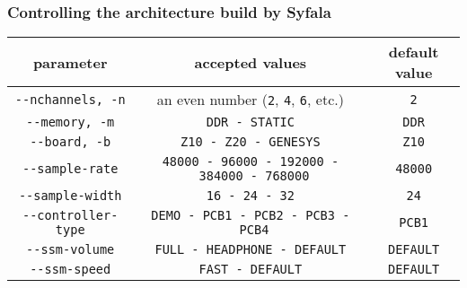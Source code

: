 \subsubsection{Controlling the architecture build by Syfala}

\begin{tabular}{|c|c|c|}
  \toprule
parameter & accepted values & default value \\
\midrule
\texttt{-\/-nchannels,\ -n} & an even number (\texttt{2}, \texttt{4},
\texttt{6}, etc.) & \texttt{2} \\
\texttt{-\/-memory,\ -m} & \texttt{DDR\ -\ STATIC} & \texttt{DDR} \\
\texttt{-\/-board,\ -b} & \texttt{Z10\ -\ Z20\ -\ GENESYS} &
\texttt{Z10} \\
\texttt{-\/-sample-rate} &
\texttt{48000\ -\ 96000\ -\ 192000\ -\ 384000\ -\ 768000} &
\texttt{48000} \\
\texttt{-\/-sample-width} & \texttt{16\ -\ 24\ -\ 32} & \texttt{24} \\
\texttt{-\/-controller-type} &
\texttt{DEMO\ -\ PCB1\ -\ PCB2\ -\ PCB3\ -\ PCB4} & \texttt{PCB1} \\
\texttt{-\/-ssm-volume} & \texttt{FULL\ -\ HEADPHONE\ -\ DEFAULT} &
\texttt{DEFAULT} \\
\texttt{-\/-ssm-speed} & \texttt{FAST\ -\ DEFAULT} & \texttt{DEFAULT} \\
\bottomrule
\end{tabular}
\\

